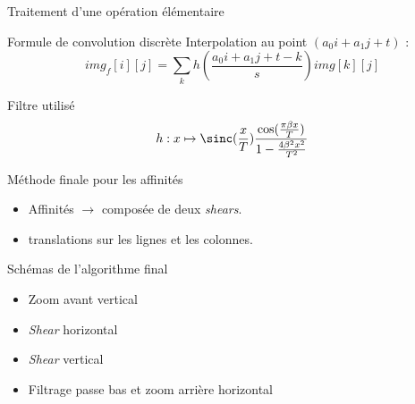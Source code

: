 \documentclass[c,12pt]{beamer}
\newcommand{\ra}[0]{\rightarrow}
\begin{document}
\begin{frame}{Traitement d'une opération élémentaire}


\begin{block}{Formule de convolution discrète}
Interpolation au point $ (a_0i+a_1j+t)$ :
\begin{equation}
	img_f[i][j] = \displaystyle{\sum_k}h\left(\frac{a_0i+a_1j+t-k}{s}\right)img[k][j]
	\label{formule_convolution_discrete}
	\end{equation}

\end{block}


\begin{block}{Filtre utilisé}
\begin{equation}
	h : x \mapsto \sinc(\frac{x}{T})\frac{\cos(\frac{\pi\beta x}{T})}{1-\frac{4\beta^2x^2}{T^2}}
	\label{szeliski_definition_raisedCosineWeightedSinc}
	\end{equation}
\end{block}

\end{frame}



\begin{frame}{Méthode finale pour les affinités}
\begin{itemize}
\item Affinités $\ra$ composée de deux \emph{shears}.
\item translations sur les lignes et les colonnes.
\end{itemize}

\begin{block}{Schémas de l'algorithme final}

\begin{itemize}
\item Zoom avant vertical
\item \emph{Shear} horizontal
\item \emph{Shear} vertical
\item Filtrage passe bas et zoom arrière horizontal
\end{itemize}

\end{block}

\end{frame}
    
\end{document}
